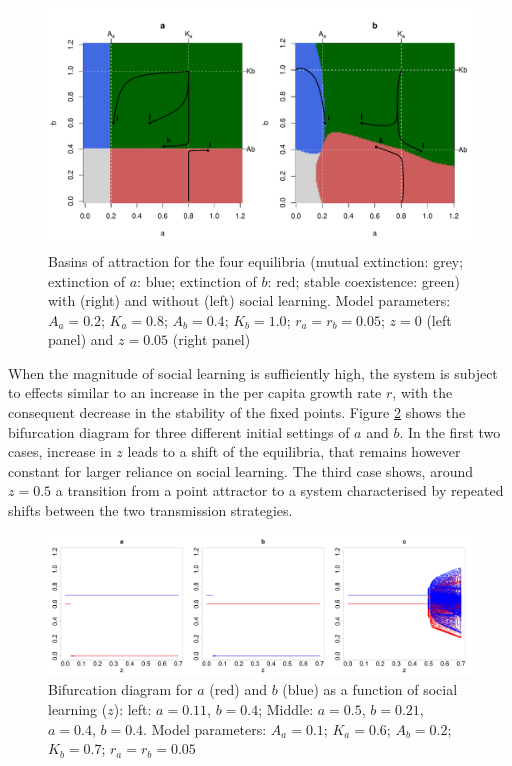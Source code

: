 \documentclass[preprint,authoryear]{elsarticle}
\begin{document}
\begin{figure}[h!]
  \centering
      \includegraphics[width=\textwidth]{./figures/figure3.pdf}
  \caption{Basins of attraction for the four equilibria (mutual extinction: grey; extinction of $a$: blue; extinction of $b$: red; stable coexistence: green) with (right) and without (left) social learning. Model parameters: $A_a=0.2$; $K_a=0.8$; $A_b=0.4$; $K_b=1.0$; $r_a=r_b=0.05$; $z=0$ (left panel) and $z=0.05$ (right panel) }
    \label{fig:TransmissionBasin}
\end{figure}

When the magnitude of social learning is sufficiently high, the system is subject to effects similar to an increase in the per capita growth rate $r$, with the consequent decrease in the stability of the fixed points. Figure \ref{fig:bifurcationWithTransmission} shows the bifurcation diagram for three different initial settings of $a$ and $b$. In the first two cases, increase in $z$ leads to a shift of the equilibria, that remains however constant for larger reliance on social learning. The third case shows, around $z=0.5$ a transition from a point attractor to a system characterised by repeated shifts between the two transmission strategies. 
\begin{figure}[h!]
  \centering
      \includegraphics[width=\textwidth]{./figures/figure4.jpg}
  \caption{Bifurcation diagram for $a$ (red) and $b$ (blue) as a function of social learning ($z$): left: $a=0.11$, $b=0.4$; Middle: $a=0.5$, $b=0.21$, $a=0.4$, $b=0.4$. Model parameters:  $A_a=0.1$; $K_a=0.6$; $A_b=0.2$; $K_b=0.7$; $r_a=r_b=0.05$}
    \label{fig:bifurcationWithTransmission}
\end{figure}
\end{document}
